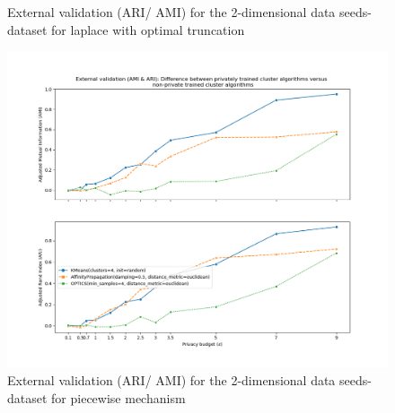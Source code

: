 {\begin{figure}[H]
\begin{minipage}[c]{0.49\textwidth}
            \caption{External validation (ARI/ AMI) for the 2-dimensional data seeds-dataset for laplace with optimal truncation}
            \label{fig:appendix-external-validation-seeds-dataset_comparison_2d-laplace-optimal-truncated}
        \end{minipage}
        \begin{minipage}[c]{0.49\textwidth}
            \includegraphics[width=1\textwidth]{Results/2d-piecewise/seeds-dataset/ami-and-ari.png}
            \caption{External validation (ARI/ AMI) for the 2-dimensional data seeds-dataset for piecewise mechanism}
            \label{fig:appendix-external-validation-seeds-dataset_comparison_2d-piecewise}
        \end{minipage}
    \end{figure}}

